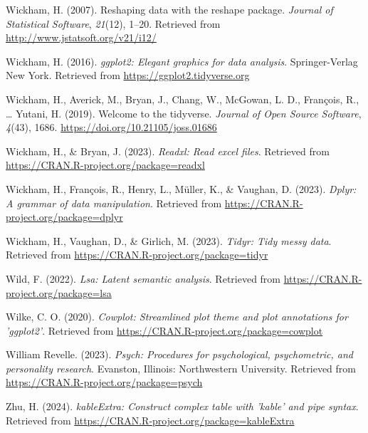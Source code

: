 \documentclass[
  man]{apa6}
\newlength{\cslhangindent}
\newlength{\cslentryspacingunit} %
\newenvironment{CSLReferences}[2] %
 {%
  \setlength{\parindent}{0pt}
  \ifodd #1
  \let\oldpar\par
  \def\par{\hangindent=\cslhangindent\oldpar}
  \fi
  \setlength{\parskip}{#2\cslentryspacingunit}
 }%
 {}
\begin{document}
\begin{CSLReferences}{1}{0}
\leavevmode{}%
Wickham, H. (2007). Reshaping data with the {reshape} package. \emph{Journal of Statistical Software}, \emph{21}(12), 1--20. Retrieved from \url{http://www.jstatsoft.org/v21/i12/}

\leavevmode{}%
Wickham, H. (2016). \emph{ggplot2: Elegant graphics for data analysis}. Springer-Verlag New York. Retrieved from \url{https://ggplot2.tidyverse.org}

\leavevmode{}%
Wickham, H., Averick, M., Bryan, J., Chang, W., McGowan, L. D., François, R., \ldots{} Yutani, H. (2019). Welcome to the {tidyverse}. \emph{Journal of Open Source Software}, \emph{4}(43), 1686. \url{https://doi.org/10.21105/joss.01686}

\leavevmode{}%
Wickham, H., \& Bryan, J. (2023). \emph{Readxl: Read excel files}. Retrieved from \url{https://CRAN.R-project.org/package=readxl}

\leavevmode{}%
Wickham, H., François, R., Henry, L., Müller, K., \& Vaughan, D. (2023). \emph{Dplyr: A grammar of data manipulation}. Retrieved from \url{https://CRAN.R-project.org/package=dplyr}

\leavevmode{}%
Wickham, H., Vaughan, D., \& Girlich, M. (2023). \emph{Tidyr: Tidy messy data}. Retrieved from \url{https://CRAN.R-project.org/package=tidyr}

\leavevmode{}%
Wild, F. (2022). \emph{Lsa: Latent semantic analysis}. Retrieved from \url{https://CRAN.R-project.org/package=lsa}

\leavevmode{}%
Wilke, C. O. (2020). \emph{Cowplot: Streamlined plot theme and plot annotations for 'ggplot2'}. Retrieved from \url{https://CRAN.R-project.org/package=cowplot}

\leavevmode{}%
William Revelle. (2023). \emph{Psych: Procedures for psychological, psychometric, and personality research}. Evanston, Illinois: Northwestern University. Retrieved from \url{https://CRAN.R-project.org/package=psych}

\leavevmode{}%
Zhu, H. (2024). \emph{kableExtra: Construct complex table with 'kable' and pipe syntax}. Retrieved from \url{https://CRAN.R-project.org/package=kableExtra}

\end{CSLReferences}
\end{document}
